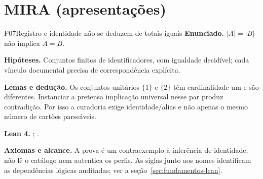 \section{MIRA (apresentações)}
\begin{formalizacao}{F07}{Registro e identidade não se deduzem de totais iguais}
\textbf{Enunciado.} $|A|=|B|$ não implica $A=B$.

\textbf{Hipóteses.} Conjuntos finitos de identificadores, com igualdade decidível; cada vínculo documental precisa de correspondência explícita.

\textbf{Lemas e dedução.} Os conjuntos unitários $\{1\}$ e $\{2\}$ têm cardinalidade um e são diferentes. Instanciar a pretensa implicação universal nesse par produz contradição. Por isso a curadoria exige identidade/alias e não apenas o mesmo número de cartões parseáveis.

\textbf{Lean 4.} ; .

\textbf{Axiomas e alcance.} A prova é um contraexemplo à inferência de identidade; não lê o catálogo nem autentica os perfis. As siglas junto aos nomes identificam as dependências lógicas auditadas; ver a seção~\ref{sec:fundamentos-lean}.
\end{formalizacao}

